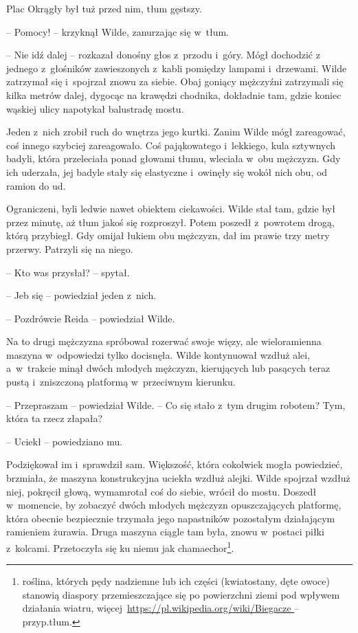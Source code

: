 \documentclass[oneside,polish,11pt,sfheadings]{mwbk}
\begin{document}
Plac Okrągły był tuż przed nim, tłum gęstszy.

-- Pomocy! -- krzyknął Wilde, zanurzając się w~tłum.

-- Nie idź dalej -- rozkazał donośny głos z~przodu i~góry. Mógł dochodzić
z jednego z~głośników zawieszonych z~kabli pomiędzy lampami i~drzewami.
Wilde zatrzymał się i~spojrzał znowu za siebie. Obaj goniący mężczyźni
zatrzymali się kilka metrów dalej, dygocąc na krawędzi chodnika,
dokładnie tam, gdzie koniec wąskiej ulicy napotykał balustradę mostu.

Jeden z~nich zrobił ruch do wnętrza jego kurtki. Zanim Wilde mógł
zareagować, coś innego szybciej zareagowało. Coś pająkowatego i~lekkiego, kula sztywnych badyli, która przeleciała ponad głowami tłumu,
wleciała w~obu mężczyzn. Gdy ich uderzała, jej badyle stały się
elastyczne i~owinęły się wokół nich obu, od ramion do ud.

Ograniczeni, byli ledwie nawet obiektem ciekawości. Wilde stał tam,
gdzie był przez minutę, aż tłum jakoś się rozproszył. Potem poszedł z~powrotem drogą, którą przybiegł. Gdy omijał łukiem obu mężczyzn, dał im
prawie trzy metry przerwy. Patrzyli się na niego.

-- Kto was przysłał? -- spytał.

-- Jeb się -- powiedział jeden z~nich.

-- Pozdrówcie Reida -- powiedział Wilde.

Na to drugi mężczyzna spróbował rozerwać swoje więzy, ale wieloramienna
maszyna w~odpowiedzi tylko docisnęła. Wilde kontynuował wzdłuż alei, a~w~trakcie minął dwóch młodych mężczyzn, kierujących lub pasących teraz
pustą i~zniszczoną platformą w~przeciwnym kierunku.

-- Przepraszam -- powiedział Wilde. -- Co się stało z~tym drugim robotem?
Tym, która ta rzecz złapała?

-- Uciekł -- powiedziano mu.

Podziękował im i~sprawdził sam. Większość, która cokolwiek mogła
powiedzieć, brzmiała, że maszyna konstrukcyjna uciekła wzdłuż alejki.
Wilde spojrzał wzdłuż niej, pokręcił głową, wymamrotał coś do siebie,
wrócił do mostu. Doszedł w~momencie, by zobaczyć dwóch młodych mężczyzn
opuszczających platformę, która obecnie bezpiecznie trzymała jego
napastników pozostałym działającym ramieniem żurawia. Druga maszyna
ciągle tam była, znowu w~postaci piłki z~kolcami. Przetoczyła się ku
niemu jak chamaechor\footnote{roślina, których pędy nadziemne lub ich
części (kwiatostany, dęte owoce) stanowią diaspory przemieszczające się
po powierzchni ziemi pod wpływem działania wiatru,
więcej~\url{https://pl.wikipedia.org/wiki/Biegacze } -- przyp.tłum.}. 
\end{document}
